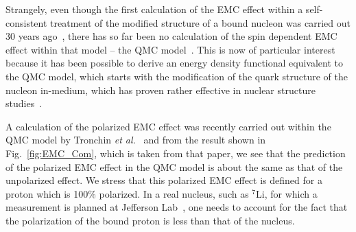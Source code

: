 Strangely, even though the first calculation of the EMC effect within a self-consistent treatment of the modified structure of a bound nucleon was carried out 30 years ago~\cite{Thomas:1989vt}, there has so far 
been no calculation of the spin dependent EMC effect within that model -- the 
QMC model~\cite{Guichon:1995ue}. This is now of particular interest because it has been possible to derive an energy density functional equivalent to the QMC model, which starts with the modification of the quark structure of the nucleon in-medium, which has proven rather effective in nuclear structure studies~\cite{Guichon:2018uew,Stone:2017oqt,Stone:2016qmi}. 

A calculation of the polarized EMC effect was recently carried out within the QMC model by 
Tronchin {\it et al.}~\cite{Tronchin:2018mvu} and from the result shown in Fig.~\ref{fig:EMC_Com}, which is taken from that paper, we see that the prediction of the polarized EMC effect in the QMC model is about the same as that of the unpolarized effect.  We stress that this polarized EMC effect is defined for a proton which is 100\% polarized. In a real nucleus, such as $^7$Li, for which a measurement is planned at Jefferson Lab~\cite{jlabspin}, one needs to account for the fact that the polarization of the bound proton is less than that of the nucleus. 




